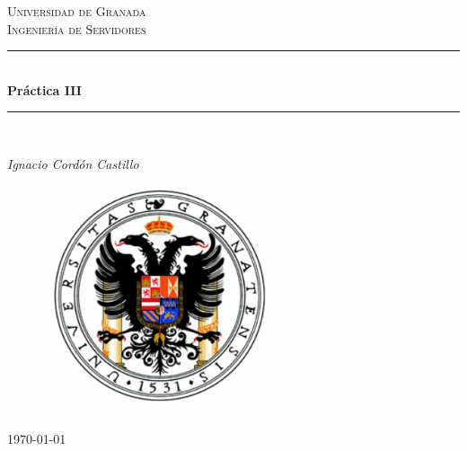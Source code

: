 \documentclass[a4paper,11pt]{article}
\begin{document}
\begin{titlepage}

\newcommand{\HRule}{\rule{\linewidth}{0.5mm}} %

\center %
 
\textsc{\LARGE Universidad de Granada}\\[1.5cm]
\textsc{\Large Ingeniería de Servidores}\\[0.5cm] 

\bigskip
\HRule \\[0.4cm]
{ \huge \bfseries Práctica III}\\[0.4cm] %
\HRule \\[1.5cm]
 

\begin{minipage}{0.4\textwidth}
\begin{center} \large
\emph{Ignacio Cordón Castillo}\\
\end{center}
\end{minipage}


\begin{center}
\includegraphics[width=9cm]{../images/ugr.jpg}
\end{center}

\vspace{\fill}%
\large\today
\end{titlepage}  
\end{document}
